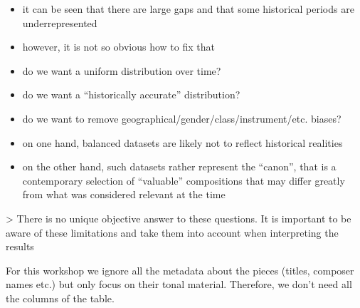 \documentclass[letterpaper,10pt,english]{sphinxmanual}
\begin{document}
\begin{sphinxVerbatim}[commandchars=\\\{\}]
   
\end{sphinxVerbatim}

\noindent{}
\begin{itemize}
\item {} 
it can be seen that there are large gaps and that some historical
periods are underrepresented

\item {} 
however, it is not so obvious how to fix that

\item {} 
do we want a uniform distribution over time?

\item {} 
do we want a “historically accurate” distribution?

\item {} 
do we want to remove geographical/gender/class/instrument/etc.
biases?

\item {} 
on one hand, balanced datasets are likely not to reflect historical
realities

\item {} 
on the other hand, such datasets rather represent the “canon”, that
is a contemporary selection of “valuable” compositions that may
differ greatly from what was considered relevant at the time

\end{itemize}

\textendash{}\textgreater{} There is no unique objective answer to these questions. It is
important to be aware of these limitations and take them into account
when interpreting the results

For this workshop we ignore all the metadata about the pieces (titles,
composer names etc.) but only focus on their tonal material. Therefore,
we don’t need all the columns of the table.

\begin{sphinxVerbatim}[commandchars=\\\{\}]
  \PYG{p}{[} \PYG{p}{]} 
\end{sphinxVerbatim}
\end{document}

